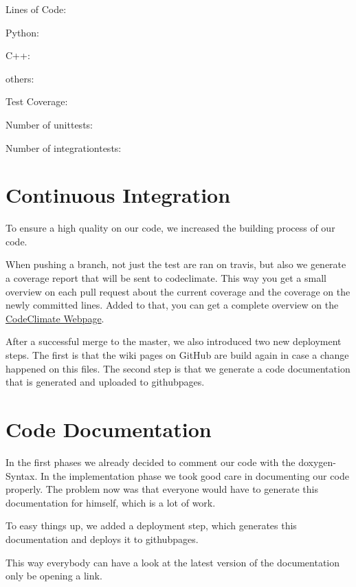 \documentclass[parskip=full]{scrartcl}
\begin{document}
Lines of Code:

Python:

C++:

others:

Test Coverage:	

Number of \glspl{unittest}:

Number of \glspl{integrationtest}:

\newpage

\section{Continuous Integration}

To ensure a high quality on our code, we increased the building process of our code.

When pushing a branch, not just the test are ran on \gls{travis}, but also we generate a coverage report that will be sent to \gls{codeclimate}.
This way you get a small overview on each pull request about the current coverage and the coverage on the newly committed lines.
Added to that, you can get a complete overview on the
\href{https://codeclimate.com/github/TheSlimvReal/PSE---LA-meets-ML}{CodeClimate Webpage}.

After a successful merge to the master, we also introduced two new deployment steps.
The first is that the wiki pages on GitHub are build again in case a change happened on this files.
The second step is that we generate a code documentation that is generated and uploaded to \gls{githubpages}.

\newpage



\section{Code Documentation}

In the first phases we already decided to comment our code with the \gls{doxygen}-Syntax.
In the implementation phase we took good care in documenting our code properly.
The problem now was that everyone would have to generate this documentation for himself, which is a lot of work.

To easy things up, we added a deployment step, which generates this documentation and deploys it to \gls{githubpages}.

This way everybody can have a look at the latest version of the documentation only be opening a link.
\end{document}
